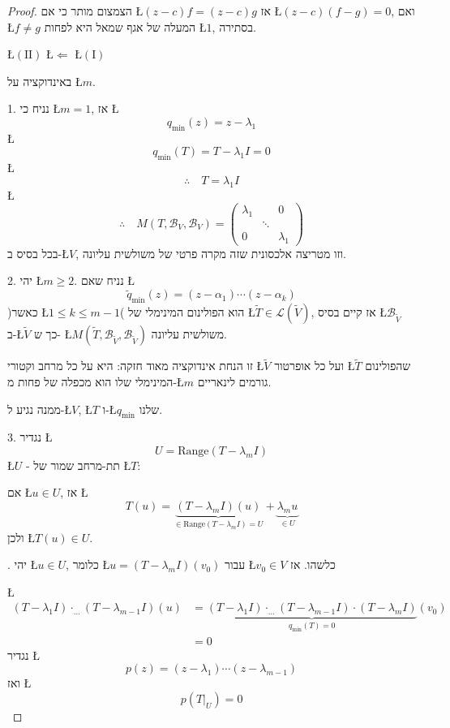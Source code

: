 \documentclass[english,hebrew]{article}
\begin{document}
\begin{proof}
הצמצום מותר כי אם \L{$(z-c)f=(z-c)g$} אז \L{$(z-c)(f-g)=0$}, ואם
\L{$f\neq g$} המעלה של אגף שמאל היא לפחות \L{$1$}, בסתירה.

\L{$(\text{II})$} \L{$\Leftarrow$} \L{$(\text{I})$}

באינדוקציה על \L{$m$}.

1. נניח כי \L{$m=1$}, אז \L{%
\[
q_{\min}(z)=z-\lambda_{1}
\]
}%
\L{%
\[
q_{\min}(T)=T-\lambda_{1}I=0
\]
}%
\L{%
\[
\therefore\quad T=\lambda_{1}I
\]
}%
\L{%
\[
\therefore\quad M(T,\mathcal{B}_{V},\mathcal{B}_{V})=\begin{pmatrix}\lambda_{1} &  & 0\\
 & \ddots\\
0 &  & \lambda_{1}
\end{pmatrix}
\]
}%
בכל בסיס ב-\L{$V$}, וזו מטריצה אלכסונית שזה מקרה פרטי של משולשית
עליונה.

2. יהי \L{$m\geq2$}. נניח שאם \L{%
\[
\widetilde{q}_{\min}(z)=(z-\alpha_{1})\cdots(z-\alpha_{k})
\]
}%
)כאשר \L{$1\leq k\leq m-1$}( הוא הפולינום המינימלי של \L{$\widetilde{T}\in\mathcal{L}(\widetilde{V})$},
אז קיים בסיס \L{$\mathcal{B}_{\widetilde{V}}$} ב-\L{$\widetilde{V}$}
כך ש- \L{$M(\widetilde{T},\mathcal{B}_{\widetilde{V}},\mathcal{B}_{\widetilde{V}})$}
משולשית עליונה.

זו הנחת אינדוקציה מאוד חזקה: היא על כל מרחב וקטורי \L{$\widetilde{V}$}
ועל כל אופרטור \L{$\widetilde{T}$} שהפולינום המינימלי שלו הוא מכפלה
של פחות מ-\L{$m$} גורמים לינאריים. 

ממנה נגיע ל-\L{$V$}, \L{$T$} ו-\L{$q_{\min}$} שלנו.

3. נגדיר \L{%
\[
U=\text{Range}(T-\lambda_{m}I)
\]
}%
\L{$U$} - תת-מרחב שמור של \L{$T$}:

אם \L{$u\in U$}, אז \L{%
\[
T(u)=\underset{\in\text{Range}(T-\lambda_{m}I)=U}{\underbrace{(T-\lambda_{m}I)(u)}}+\underset{\in U}{\underbrace{\lambda_{m}u}}
\]
}%
ולכן \L{$T(u)\in U$}.

{\endL}. יהי \L{$u\in U$}, כלומר \L{$u=(T-\lambda_{m}I)\left(v_{0}\right)$}
עבור \L{$v_{0}\in V$} כלשהו. אז

\L{%
\begin{align*}
(T-\lambda_{1}I)\cdot_{\dots}(T-\lambda_{m-1}I)\left(u\right) & =\underset{q_{\min}(T)=0}{\underbrace{(T-\lambda_{1}I)\cdot_{\dots}(T-\lambda_{m-1}I)\cdot(T-\lambda_{m}I)}}\left(v_{0}\right)\\
 & =0
\end{align*}
}%
נגדיר \L{%
\[
p(z)=(z-\lambda_{1})\cdots(z-\lambda_{m-1})
\]
}%
ואז \L{%
\[
p(T|_{U})=0
\]
}%


\end{proof}
\end{document}
